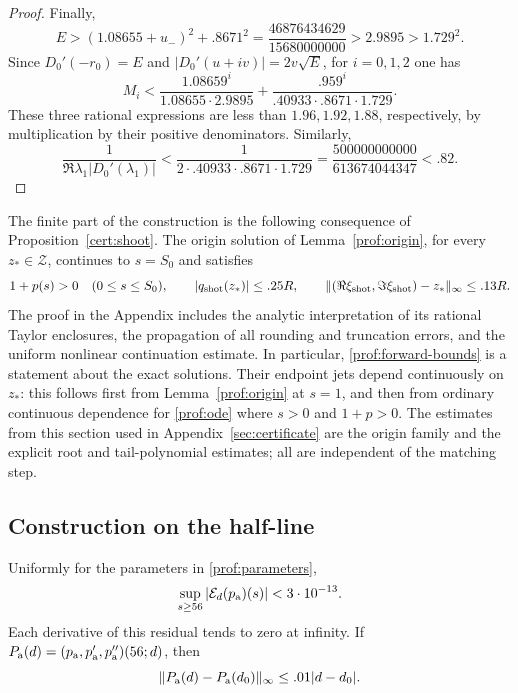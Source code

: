 \begin{proof}
Finally,
\[
 E>(1.08655+u_-)^2+.8671^2
   =\frac{46876434629}{15680000000}>2.9895>1.729^2.
\]
Since $D_0'(-r_0)=E$ and $|D_0'(u+iv)|=2v\sqrt E$, for $i=0,1,2$ one has
\[
 M_i<\frac{1.08659^i}{1.08655\cdot2.9895}
      +\frac{.959^i}{.40933\cdot.8671\cdot1.729}.
\]
These three rational expressions are less than $1.96,1.92,1.88$,
respectively, by multiplication by their positive denominators.  Similarly,
\[
 \frac1{\Re\lambda_1|D_0'(\lambda_1)|}
 <\frac1{2\cdot.40933\cdot.8671\cdot1.729}
 =\frac{500000000000}{613674044347}<.82.
\]
\end{proof}

The finite part of the construction is the following consequence of
Proposition~\ref{cert:shoot}.  The origin solution of
Lemma~\ref{prof:origin}, for every $z_*\in\mathcal Z$, continues to
$s=S_0$ and satisfies
\begin{equation}\label{prof:forward-bounds}
 1+p(s)>0\quad(0\le s\le S_0),\qquad
 |q_{\rm shot}(z_*)|\le .25R,
 \qquad
 \lVert (\Re\xi_{\rm shot},\Im\xi_{\rm shot})-z_*\rVert_\infty\le .13R.
\end{equation}
The proof in the Appendix includes the analytic interpretation of its
rational Taylor enclosures, the propagation of all rounding and truncation
errors, and the uniform nonlinear continuation estimate.  In particular,
\eqref{prof:forward-bounds} is a statement about the exact solutions.
Their endpoint jets depend continuously on $z_*$: this follows first from
Lemma~\ref{prof:origin} at $s=1$, and then from ordinary continuous
dependence for \eqref{prof:ode} where $s>0$ and $1+p>0$.
The estimates from this section used in Appendix~\ref{sec:certificate}
are the origin family and the explicit root and tail-polynomial estimates;
all are independent of the matching step.

\subsection{Construction on the half-line}

\begin{lemma}\label{prof:tail-residual}
Uniformly for the parameters in \eqref{prof:parameters},
\[
 \sup_{s\ge56}|\mathcal E_d(p_{\rm a})(s)|<3\cdot10^{-13}.
\]
Each derivative of this residual tends to zero at infinity.
If $P_{\rm a}(d)=(p_{\rm a},p_{\rm a}',p_{\rm a}'')(56;d)$, then
\begin{equation}\label{prof:tail-parameter-bound}
 \lVert P_{\rm a}(d)-P_{\rm a}(d_0)\rVert_\infty\le .01|d-d_0|.
\end{equation}
\end{lemma}

